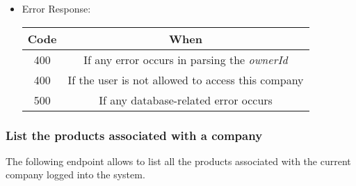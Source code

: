 \begin{itemize}
    \item Error Response:
    \begin{table}[!h]
    \centering 
    \begin{tabular}{|c|c|}
    \hline
    \multicolumn{1}{|c|}{\textbf{Code}} & \multicolumn{1}{c|}{\textbf{When}} \\ \hline
    400 & If any error occurs in parsing the \textit{ownerId}  \\\hline
    400 & If the user is not allowed to access this company \\\hline
    500 & If any database-related error occurs \\\hline
    \end{tabular} 
    \end{table} 
    
\end{itemize}


\newpage
\subsubsection*{List the products associated with a company}

The following endpoint allows to list all the products associated with the current company logged into the system.

